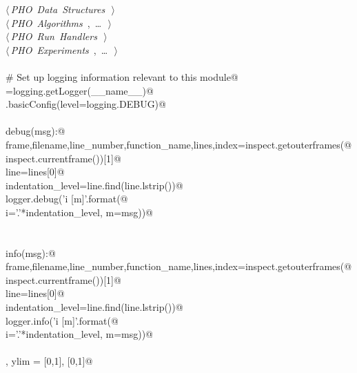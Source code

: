 \documentclass[10.0pt]{report}
\begin{document}
\begin{appendices}
\begin{flushleft}
\begin{list}{}{}
\mbox{}\verb@@\hbox{$\langle\,${\itshape PHO Data Structures}\nobreak\ {\footnotesize {}}$\,\rangle$}\verb@@\\
\mbox{}\verb@@\hbox{$\langle\,${\itshape PHO Algorithms}\nobreak\ {\footnotesize {}, \ldots\ }$\,\rangle$}\verb@@\\
\mbox{}\verb@@\hbox{$\langle\,${\itshape PHO Run Handlers}\nobreak\ {\footnotesize {}}$\,\rangle$}\verb@@\\
\mbox{}\verb@@\hbox{$\langle\,${\itshape PHO Experiments}\nobreak\ {\footnotesize {}, \ldots\ }$\,\rangle$}\verb@@\\
\mbox{}\verb@@\\
\mbox{}\verb@# Set up logging information relevant to this module@\\
\mbox{}\verb@logger=logging.getLogger(__name__)@\\
\mbox{}\verb@logging.basicConfig(level=logging.DEBUG)@\\
\mbox{}\verb@@\\
\mbox{}\verb@def debug(msg):@\\
\mbox{}\verb@    frame,filename,line_number,function_name,lines,index=inspect.getouterframes(@\\
\mbox{}\verb@        inspect.currentframe())[1]@\\
\mbox{}\verb@    line=lines[0]@\\
\mbox{}\verb@    indentation_level=line.find(line.lstrip())@\\
\mbox{}\verb@    logger.debug('{i} [{m}]'.format(@\\
\mbox{}\verb@        i='.'*indentation_level, m=msg))@\\
\mbox{}\verb@@\\
\mbox{}\verb@@\\
\mbox{}\verb@def info(msg):@\\
\mbox{}\verb@    frame,filename,line_number,function_name,lines,index=inspect.getouterframes(@\\
\mbox{}\verb@        inspect.currentframe())[1]@\\
\mbox{}\verb@    line=lines[0]@\\
\mbox{}\verb@    indentation_level=line.find(line.lstrip())@\\
\mbox{}\verb@    logger.info('{i} [{m}]'.format(@\\
\mbox{}\verb@        i='.'*indentation_level, m=msg))@\\
\mbox{}\verb@@\\
\mbox{}\verb@xlim, ylim = [0,1], [0,1]@\\

\end{list}
\end{flushleft}
\end{appendices}
\end{document}
